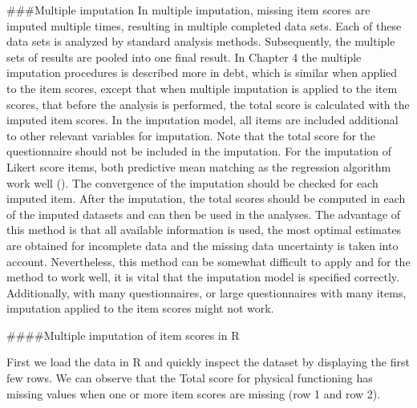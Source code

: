 \documentclass[
]{book}
\newenvironment{Shaded}{\begin{snugshade}}{\end{snugshade}}
\newcommand{\DecValTok}[1]{\textcolor[rgb]{0.00,0.00,0.81}{#1}}
\newcommand{\KeywordTok}[1]{\textcolor[rgb]{0.13,0.29,0.53}{\textbf{#1}}}
\newcommand{\NormalTok}[1]{#1}
\newcommand{\OperatorTok}[1]{\textcolor[rgb]{0.81,0.36,0.00}{\textbf{#1}}}
\newcommand{\OtherTok}[1]{\textcolor[rgb]{0.56,0.35,0.01}{#1}}
\newcommand{\StringTok}[1]{\textcolor[rgb]{0.31,0.60,0.02}{#1}}
\begin{document}
\#\#\#Multiple imputation
In multiple imputation, missing item scores are imputed multiple times, resulting in multiple completed data sets. Each of these data sets is analyzed by standard analysis methods. Subsequently, the multiple sets of results are pooled into one final result. In Chapter 4 the multiple imputation procedures is described more in debt, which is similar when applied to the item scores, except that when multiple imputation is applied to the item scores, that before the analysis is performed, the total score is calculated with the imputed item scores. In the imputation model, all items are included additional to other relevant variables for imputation. Note that the total score for the questionnaire should not be included in the imputation. For the imputation of Likert score items, both predictive mean matching as the regression algorithm work well (\citet{Eekhout2014}). The convergence of the imputation should be checked for each imputed item. After the imputation, the total scores should be computed in each of the imputed datasets and can then be used in the analyses. The advantage of this method is that all available information is used, the most optimal estimates are obtained for incomplete data and the missing data uncertainty is taken into account. Nevertheless, this method can be somewhat difficult to apply and for the method to work well, it is vital that the imputation model is specified correctly. Additionally, with many questionnaires, or large questionnaires with many items, imputation applied to the item scores might not work.

\#\#\#\#Multiple imputation of item scores in R

First we load the data in R and quickly inspect the dataset by displaying the first few rows. We can observe that the Total score for physical functioning has missing values when one or more item scores are missing (row 1 and row 2).

\begin{Shaded}
\end{Shaded}
\end{document}
